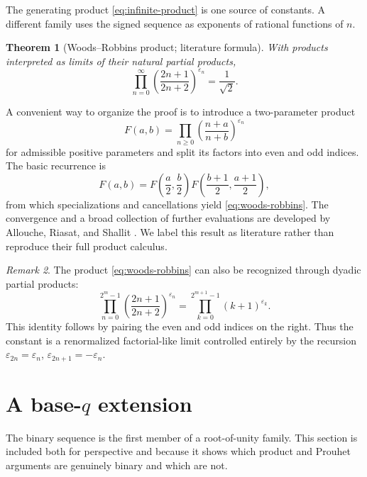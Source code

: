 \documentclass[11pt,oneside]{article}
\newtheorem{theorem}{Theorem}[section]
\theoremstyle{definition}
\theoremstyle{remark}
\newtheorem{remark}[theorem]{Remark}
\newcommand{\eps}{\varepsilon}
\newcommand{\1}{\mathbf 1}
\begin{document}
The generating product \eqref{eq:infinite-product} is one source of constants.  A different
family uses the signed sequence as exponents of rational functions of \(n\).

\begin{theorem}[Woods--Robbins product; literature formula]
\label{thm:woods-robbins}
With products interpreted as limits of their natural partial products,
\begin{equation}
 \boxed{
 \prod_{n=0}^{\infty}
 \left(\frac{2n+1}{2n+2}\right)^{\eps_n}
 =\frac1{\sqrt2}.}
 \label{eq:woods-robbins}
\end{equation}
\end{theorem}

A convenient way to organize the proof is to introduce a two-parameter product
\[
 F(a,b)=\prod_{n\ge0}\left(\frac{n+a}{n+b}\right)^{\eps_n}
\]
for admissible positive parameters and split its factors into even and odd indices.  The basic
recurrence is
\begin{equation}
 F(a,b)=F\!\left(\frac a2,\frac b2\right)
        F\!\left(\frac{b+1}{2},\frac{a+1}{2}\right),
 \label{eq:F-functional-product}
\end{equation}
from which specializations and cancellations yield \eqref{eq:woods-robbins}.  The convergence
and a broad collection of further evaluations are developed by Allouche, Riasat, and Shallit
\cite{alloucheriasatshallit2019}.  We label this result as literature rather than reproduce
their full product calculus.

\begin{remark}
The product \eqref{eq:woods-robbins} can also be recognized through dyadic partial products:
\[
 \prod_{n=0}^{2^m-1}\left(\frac{2n+1}{2n+2}\right)^{\eps_n}
 =\prod_{k=0}^{2^{m+1}-1}(k+1)^{\eps_k}.
\]
This identity follows by pairing the even and odd indices on the right.  Thus the constant is
a renormalized factorial-like limit controlled entirely by the recursion
\(\eps_{2n}=\eps_n\), \(\eps_{2n+1}=-\eps_n\).
\end{remark}

\section{A base-\texorpdfstring{\(q\)}{q} extension}
\label{sec:baseq}

The binary sequence is the first member of a root-of-unity family.  This section is included
both for perspective and because it shows which product and Prouhet arguments are genuinely
binary and which are not.
\end{document}
